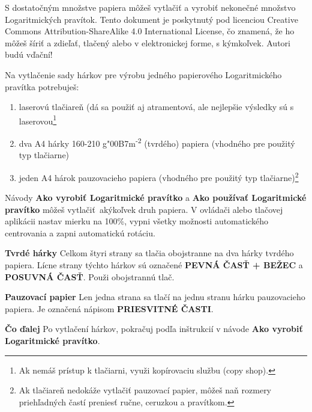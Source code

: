   \begin{multicols*}{3}
  \normalsize{

  S dostatočným množstve papiera môžeš vytlačiť a vyrobiť nekonečné množstvo Logaritmických pravítok. Tento dokument je poskytnutý pod licenciou Creative Commons Attribution-ShareAlike 4.0 International License, čo znamená, že ho môžeš šíriť a zdieľať, tlačený alebo v elektronickej forme, s kýmkoľvek. Autori budú vďační!

  Na vytlačenie sady hárkov pre výrobu jedného papierového Logaritmického pravítka potrebuješ:
    \begin{enumerate}
      \setlength{\parskip}{0pt}
      \setlength{\parsep}{0pt}
      \item laserovú tlačiareň (dá sa použiť aj atramentová, ale nejlepšie výsledky sú s laserovou\footnote{Ak nemáš prístup k tlačiarni, využi kopírovaciu službu (copy shop).}
      \item dva A4 hárky 160-210 g{\char"00B7}m\textsuperscript{-2} (tvrdého) papiera (vhodného pre použitý typ tlačiarne)
      \item jeden A4 hárok pauzovacieho papiera (vhodného pre použitý typ tlačiarne)\footnote{Ak tlačiareň nedokáže vytlačiť pauzovací papier, môžeš naň rozmery priehľadných častí preniesť ručne, ceruzkou a pravítkom.}
    \end{enumerate}

  Návody \textbf{Ako vyrobiť Logaritmické pravítko} a \textbf{Ako používať Logaritmické pravítko} môžeš vytlačiť akýkoľvek druh papiera. V ovládači alebo tlačovej aplikácii nastav mierku na 100\%, vypni všetky možnosti automatického centrovania a zapni automatickú rotáciu.

  \textbf{Tvrdé hárky}
Celkom štyri strany sa tlačia obojstranne na dva hárky tvrdého papiera. Lícne strany týchto hárkov sú označené \textbf{PEVNÁ ČASŤ + BEŽEC} a \textbf{POSUVNÁ ČASŤ}. Použi obojstrannú tlač.

  \textbf{Pauzovací papier}
Len jedna strana sa tlačí na jednu stranu hárku pauzovacieho papiera. Je označená nápisom \textbf{PRIESVITNÉ ČASTI}.

  \textbf{Čo ďalej}
Po vytlačení hárkov, pokračuj podľa inštrukcií v návode \textbf{Ako vyrobiť Logaritmické pravítko}.

  }
  \end{multicols*}
  

